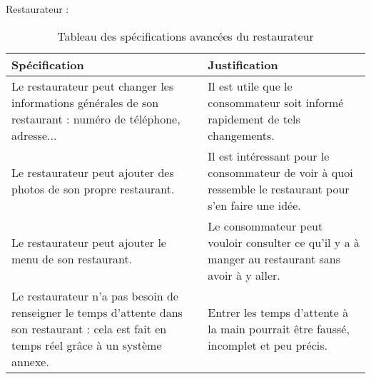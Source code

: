 Restaurateur : \\

\begin{table}[H]
    \centering
    \caption{Tableau des spécifications avancées du restaurateur}
    \label{min-spec-table}
    \begin{tabular}{p{8cm}|p{8cm}}
        \bf{Spécification} & \bf{Justification} \\ \hline
Le restaurateur peut changer les informations générales de son restaurant : numéro de téléphone, adresse... & Il est utile que le consommateur soit informé rapidement de tels changements. \\ \hline
Le restaurateur peut ajouter des photos de son propre restaurant. & Il est intéressant pour le consommateur de voir à quoi ressemble le restaurant pour s'en faire une idée. \\ \hline
Le restaurateur peut ajouter le menu de son restaurant. & Le consommateur peut vouloir consulter ce qu'il y a à manger au restaurant sans avoir à y aller. \\ \hline
Le restaurateur n'a pas besoin de renseigner le temps d'attente dans son restaurant : cela est fait en temps réel grâce à un système annexe. & Entrer les temps d'attente à la main pourrait être faussé, incomplet et peu précis. \\
    \end{tabular}
\end{table}